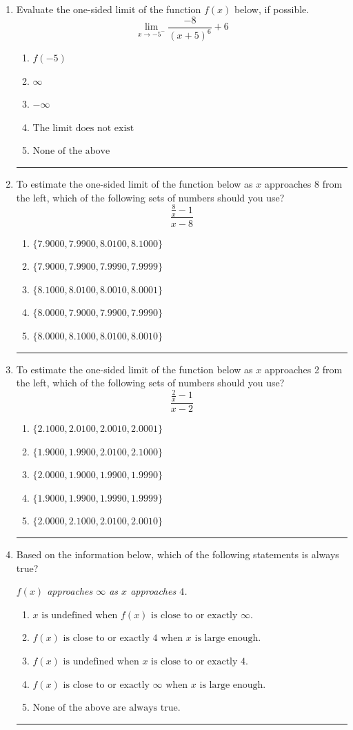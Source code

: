 \documentclass[14pt]{extbook}
\newcommand{\litem}[1]{\item#1\hspace*{-1cm}\rule{\textwidth}{0.4pt}}
\begin{document}
\begin{enumerate}
{\begin{enumerate}[label=\Alph*.]
\end{enumerate} }
\litem{
Evaluate the one-sided limit of the function $f(x)$ below, if possible.\[ \lim_{x \rightarrow -5^-} \frac{-8}{(x+5)^6}+6 \]\begin{enumerate}[label=\Alph*.]
\item \( f(-5) \)
\item \( \infty \)
\item \( -\infty \)
\item \( \text{The limit does not exist} \)
\item \( \text{None of the above} \)

\end{enumerate} }
\litem{
To estimate the one-sided limit of the function below as $x$ approaches 8 from the left, which of the following sets of numbers should you use?\[ \frac{\frac{8}{x} - 1}{x - 8} \]\begin{enumerate}[label=\Alph*.]
\item \( \{ 7.9000, 7.9900, 8.0100, 8.1000 \} \)
\item \( \{ 7.9000, 7.9900, 7.9990, 7.9999 \} \)
\item \( \{ 8.1000, 8.0100, 8.0010, 8.0001 \} \)
\item \( \{ 8.0000, 7.9000, 7.9900, 7.9990 \} \)
\item \( \{ 8.0000, 8.1000, 8.0100, 8.0010 \} \)

\end{enumerate} }
\litem{
To estimate the one-sided limit of the function below as $x$ approaches 2 from the left, which of the following sets of numbers should you use?\[ \frac{\frac{2}{x} - 1}{x - 2} \]\begin{enumerate}[label=\Alph*.]
\item \( \{ 2.1000, 2.0100, 2.0010, 2.0001 \} \)
\item \( \{ 1.9000, 1.9900, 2.0100, 2.1000 \} \)
\item \( \{ 2.0000, 1.9000, 1.9900, 1.9990 \} \)
\item \( \{ 1.9000, 1.9900, 1.9990, 1.9999 \} \)
\item \( \{ 2.0000, 2.1000, 2.0100, 2.0010 \} \)

\end{enumerate} }
\litem{
Based on the information below, which of the following statements is always true?
\begin{center}
    \textit{ $f(x)$ approaches $\infty$ as $x$ approaches $4$. }
\end{center}
\begin{enumerate}[label=\Alph*.]
\item \( x \text{ is undefined when } f(x) \text{ is close to or exactly } \infty. \)
\item \( f(x) \text{ is close to or exactly } 4 \text{ when } x \text{ is large enough}. \)
\item \( f(x) \text{ is undefined when } x \text{ is close to or exactly } 4. \)
\item \( f(x) \text{ is close to or exactly } \infty \text{ when } x \text{ is large enough}. \)
\item \( \text{None of the above are always true.} \)


\end{enumerate}}
\end{enumerate}
\end{document}
